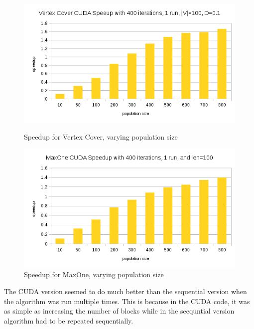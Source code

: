 \documentclass[9pt]{article}
\begin{document}
\begin{figure}[t]
  \centering
  \includegraphics[width=.9\textwidth]{vc_change_pop.png}
  \caption{Speedup for Vertex Cover, varying population size}
  \centering
  \includegraphics[width=.9\textwidth]{maxone_change_pop.png}
  \caption{Speedup for MaxOne, varying population size}
\end{figure}

The CUDA version seemed to do much better than the sequential version when the algorithm was run multiple times. This is because in the CUDA code, it was as simple as increasing the number of blocks while in the seequntial version algorithm had to be repeated sequentially.\\
\end{document}

